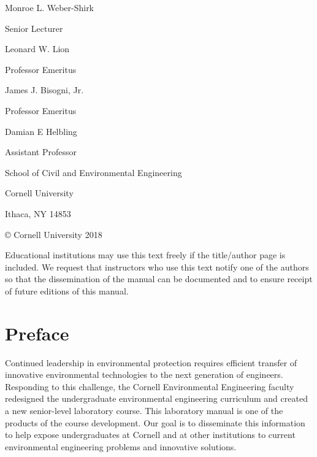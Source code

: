 \documentclass[letterpaper,10pt,english]{sphinxmanual}
\begin{document}
\begin{DUlineblock}{0em}
\item[] Monroe L. Weber-Shirk
\item[] Senior Lecturer
\end{DUlineblock}

\begin{DUlineblock}{0em}
\item[] Leonard W. Lion
\item[] Professor Emeritus
\end{DUlineblock}

\begin{DUlineblock}{0em}
\item[] James J. Bisogni, Jr.
\item[] Professor Emeritus
\end{DUlineblock}

\begin{DUlineblock}{0em}
\item[] Damian E Helbling
\item[] Assistant Professor
\end{DUlineblock}

\begin{DUlineblock}{0em}
\item[] School of Civil and Environmental Engineering
\item[] Cornell University
\item[] Ithaca, NY 14853
\end{DUlineblock}

© Cornell University 2018

Educational institutions may use this text freely if the title/author page is included. We request that instructors who use this text notify one of the authors so that the dissemination of the manual can be documented and to ensure receipt of future editions of this manual.


\section{Preface}
\label{\detokenize{Title_and_Preface/Title_and_Preface:preface}}
Continued leadership in environmental protection requires efficient transfer of innovative environmental technologies to the next generation of engineers. Responding to this challenge, the Cornell Environmental Engineering faculty redesigned the undergraduate environmental engineering curriculum and created a new senior-level laboratory course. This laboratory manual is one of the products of the course development. Our goal is to disseminate this information to help expose undergraduates at Cornell and at other institutions to current environmental engineering problems and innovative solutions.
\end{document}
